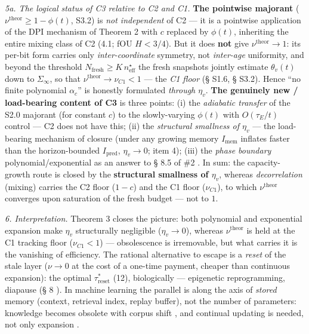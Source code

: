 \documentclass[12pt]{iopart}
\begin{document}
\emph{5a. The logical status of C3 relative to C2 and C1.} \textbf{The pointwise majorant} (\(\nu^{\text{theor}} \ge 1-\phi(t)\), S3.2) is \emph{not independent} of C2 --- it is a pointwise application of the DPI mechanism of Theorem 2 with \(c\) replaced by \(\phi(t)\), inheriting the entire mixing class of C2 (4.1; fOU \(H<3/4\)). But it does \textbf{not} give \(\nu^{\text{theor}} \to 1\): its per-bit form carries only \emph{inter-coordinate} symmetry, not \emph{inter-age} uniformity, and beyond the threshold \(N_{\text{fresh}} \ge K\,n_{\text{eff}}^\star\) the fresh snapshots jointly estimate \(\theta_v(t)\) down to \(\Sigma_\infty\), so that \(\nu^{\text{theor}} \to \nu_{C1} < 1\) --- the \emph{C1 floor} (§ S1.6, § S3.2). Hence ``no finite polynomial \(\alpha_c\)'' is honestly formulated \emph{through \(\eta_v\)}. \textbf{The genuinely new / load-bearing content of C3} is three points: (i) the \emph{adiabatic transfer} of the S2.0 majorant (for constant \(c\)) to the slowly-varying \(\phi(t)\) with \(O(\tau_E/t)\) control --- C2 does not have this; (ii) the \emph{structural smallness of \(\eta_v\)} --- the load-bearing mechanism of closure (under any growing memory \(I_{\text{mem}}\) inflates faster than the horizon-bounded \(I_{\text{pred}}\), \(\eta_v \to 0\); item 4); (iii) the \emph{phase boundary} polynomial/exponential as an answer to § 8.5 of \#2 \cite{Andriishin2026b}. In sum: the capacity-growth route is closed by the \textbf{structural smallness of \(\eta_v\)}, whereas \emph{decorrelation} (mixing) carries the C2 floor (\(1-c\)) and the C1 floor (\(\nu_{C1}\)), to which \(\nu^{\text{theor}}\) converges upon saturation of the fresh budget --- not to \(1\).



\emph{6. Interpretation.} Theorem 3 closes the picture: both polynomial and exponential expansion make \(\eta_v\) structurally negligible (\(\eta_v \to 0\)), whereas \(\nu^{\text{theor}}\) is held at the C1 tracking floor (\(\nu_{C1} < 1\)) --- obsolescence is irremovable, but what carries it is the vanishing of efficiency. The rational alternative to escape is a \emph{reset} of the stale layer (\(\nu \to 0\) at the cost of a one-time payment, cheaper than continuous expansion): the optimal \(\tau_{\text{reset}}^*\) \cite{Andriishin2026b} (12), biologically --- epigenetic reprogramming, diapause (§ 8 \cite{Andriishin2026b}). In machine learning the parallel is along the axis of \emph{stored} memory (context, retrieval index, replay buffer), not the number of parameters: knowledge becomes obsolete with corpus shift \cite{Lazaridou2021,Dhingra2022}, and continual updating is needed, not only expansion \cite{Gama2014}.
\end{document}
